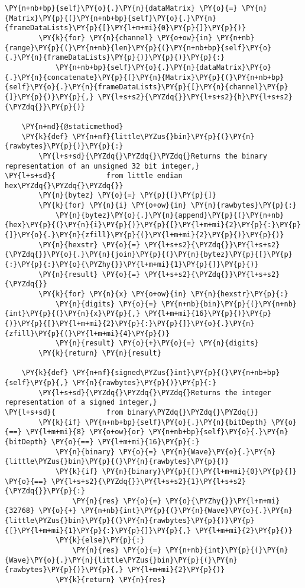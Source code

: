 \begin{Verbatim}[commandchars=\\\{\}]
        \PY{n+nb+bp}{self}\PY{o}{.}\PY{n}{dataMatrix} \PY{o}{=} \PY{n}{Matrix}\PY{p}{(}\PY{n+nb+bp}{self}\PY{o}{.}\PY{n}{frameDataLists}\PY{p}{[}\PY{l+m+mi}{0}\PY{p}{]}\PY{p}{)}
        \PY{k}{for} \PY{n}{channel} \PY{o+ow}{in} \PY{n+nb}{range}\PY{p}{(}\PY{n+nb}{len}\PY{p}{(}\PY{n+nb+bp}{self}\PY{o}{.}\PY{n}{frameDataLists}\PY{p}{)}\PY{p}{)}\PY{p}{:}
            \PY{n+nb+bp}{self}\PY{o}{.}\PY{n}{dataMatrix}\PY{o}{.}\PY{n}{concatenate}\PY{p}{(}\PY{n}{Matrix}\PY{p}{(}\PY{n+nb+bp}{self}\PY{o}{.}\PY{n}{frameDataLists}\PY{p}{[}\PY{n}{channel}\PY{p}{]}\PY{p}{)}\PY{p}{,} \PY{l+s+s2}{\PYZdq{}}\PY{l+s+s2}{h}\PY{l+s+s2}{\PYZdq{}}\PY{p}{)}

    \PY{n+nd}{@staticmethod}
    \PY{k}{def} \PY{n+nf}{little\PYZus{}bin}\PY{p}{(}\PY{n}{rawbytes}\PY{p}{)}\PY{p}{:}
        \PY{l+s+sd}{\PYZdq{}\PYZdq{}\PYZdq{}Returns the binary representation of an unsigned 32 bit integer,}
\PY{l+s+sd}{            from little endian hex\PYZdq{}\PYZdq{}\PYZdq{}}
        \PY{n}{bytez} \PY{o}{=} \PY{p}{[}\PY{p}{]}
        \PY{k}{for} \PY{n}{i} \PY{o+ow}{in} \PY{n}{rawbytes}\PY{p}{:}
            \PY{n}{bytez}\PY{o}{.}\PY{n}{append}\PY{p}{(}\PY{n+nb}{hex}\PY{p}{(}\PY{n}{i}\PY{p}{)}\PY{p}{[}\PY{l+m+mi}{2}\PY{p}{:}\PY{p}{]}\PY{o}{.}\PY{n}{zfill}\PY{p}{(}\PY{l+m+mi}{2}\PY{p}{)}\PY{p}{)}
        \PY{n}{hexstr} \PY{o}{=} \PY{l+s+s2}{\PYZdq{}}\PY{l+s+s2}{\PYZdq{}}\PY{o}{.}\PY{n}{join}\PY{p}{(}\PY{n}{bytez}\PY{p}{[}\PY{p}{:}\PY{p}{:}\PY{o}{\PYZhy{}}\PY{l+m+mi}{1}\PY{p}{]}\PY{p}{)}
        \PY{n}{result} \PY{o}{=} \PY{l+s+s2}{\PYZdq{}}\PY{l+s+s2}{\PYZdq{}}
        \PY{k}{for} \PY{n}{x} \PY{o+ow}{in} \PY{n}{hexstr}\PY{p}{:}
            \PY{n}{digits} \PY{o}{=} \PY{n+nb}{bin}\PY{p}{(}\PY{n+nb}{int}\PY{p}{(}\PY{n}{x}\PY{p}{,} \PY{l+m+mi}{16}\PY{p}{)}\PY{p}{)}\PY{p}{[}\PY{l+m+mi}{2}\PY{p}{:}\PY{p}{]}\PY{o}{.}\PY{n}{zfill}\PY{p}{(}\PY{l+m+mi}{4}\PY{p}{)}
            \PY{n}{result} \PY{o}{+}\PY{o}{=} \PY{n}{digits}
        \PY{k}{return} \PY{n}{result}

    \PY{k}{def} \PY{n+nf}{signed\PYZus{}int}\PY{p}{(}\PY{n+nb+bp}{self}\PY{p}{,} \PY{n}{rawbytes}\PY{p}{)}\PY{p}{:}
        \PY{l+s+sd}{\PYZdq{}\PYZdq{}\PYZdq{}Returns the integer representation of a signed integer,}
\PY{l+s+sd}{            from binary\PYZdq{}\PYZdq{}\PYZdq{}}
        \PY{k}{if} \PY{n+nb+bp}{self}\PY{o}{.}\PY{n}{bitDepth} \PY{o}{==} \PY{l+m+mi}{8} \PY{o+ow}{or} \PY{n+nb+bp}{self}\PY{o}{.}\PY{n}{bitDepth} \PY{o}{==} \PY{l+m+mi}{16}\PY{p}{:}
            \PY{n}{binary} \PY{o}{=} \PY{n}{Wave}\PY{o}{.}\PY{n}{little\PYZus{}bin}\PY{p}{(}\PY{n}{rawbytes}\PY{p}{)}
            \PY{k}{if} \PY{n}{binary}\PY{p}{[}\PY{l+m+mi}{0}\PY{p}{]} \PY{o}{==} \PY{l+s+s2}{\PYZdq{}}\PY{l+s+s2}{1}\PY{l+s+s2}{\PYZdq{}}\PY{p}{:}
                \PY{n}{res} \PY{o}{=} \PY{o}{\PYZhy{}}\PY{l+m+mi}{32768} \PY{o}{+} \PY{n+nb}{int}\PY{p}{(}\PY{n}{Wave}\PY{o}{.}\PY{n}{little\PYZus{}bin}\PY{p}{(}\PY{n}{rawbytes}\PY{p}{)}\PY{p}{[}\PY{l+m+mi}{1}\PY{p}{:}\PY{p}{]}\PY{p}{,} \PY{l+m+mi}{2}\PY{p}{)}
            \PY{k}{else}\PY{p}{:}
                \PY{n}{res} \PY{o}{=} \PY{n+nb}{int}\PY{p}{(}\PY{n}{Wave}\PY{o}{.}\PY{n}{little\PYZus{}bin}\PY{p}{(}\PY{n}{rawbytes}\PY{p}{)}\PY{p}{,} \PY{l+m+mi}{2}\PY{p}{)}
            \PY{k}{return} \PY{n}{res}


\end{Verbatim}

